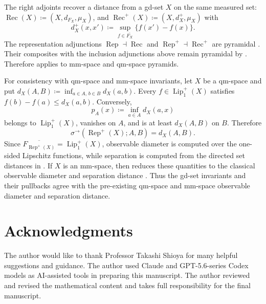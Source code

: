 \documentclass{amsart}
\theoremstyle{plain}
\theoremstyle{definition}
\theoremstyle{remark}
\newcommand{\lipplus}{\operatorname{Lip}^{+}_{1}}
\begin{document}
The right adjoints recover a distance from a gd-set $X$ on the same measured
set: $\operatorname{Rec}(X)\coloneqq(X,d_{F_X},\mu_X)$, and
$\operatorname{Rec}^{+}(X)\coloneqq(X,d_X^{+},\mu_X)$ with
\[d_X^{+}(x,x')\coloneqq\sup_{f\in\overline{F_X}}\{f(x')-f(x)\}.\]
The representation adjunctions $\operatorname{Rep}\dashv\operatorname{Rec}$ and
$\operatorname{Rep}^{+}\dashv\operatorname{Rec}^{+}$ are pyramidal
\cite[Corollary~A.12]{gds3-ja}.  Their composites with the inclusion
adjunctions above remain pyramidal by
\cite[Proposition~A.8]{gds3-ja}.  Therefore
 applies to mm-space and qm-space
pyramids.

For consistency with qm-space and mm-space invariants, let $X$ be a qm-space
and put $d_X(A,B)\coloneqq\inf_{a\in A,\,b\in B}d_X(a,b)$.  Every
$f\in\lipplus(X)$ satisfies $f(b)-f(a)\leq d_X(a,b)$.  Conversely,
\[
p_A(x)\coloneqq\inf_{a\in A}d_X(a,x)
\]
belongs to $\lipplus(X)$, vanishes on $A$, and is at least $d_X(A,B)$ on
$B$.  Therefore
\begin{equation}
\label{eq:qms-directed-separation-computation}
\sigma^{\to}(\operatorname{Rep}^{+}(X);A,B)=d_X(A,B).
\end{equation}
Since $\overline{F_{\operatorname{Rep}^{+}(X)}}=\lipplus(X)$, observable diameter is
computed over the one-sided Lipschitz functions, while separation is computed
from the directed set distances in
.  If $X$ is an mm-space, then
 reduces these quantities to the
	classical observable diameter and separation distance
	\cite[Definitions~2.13 and~2.24]{shioya2016mmg}.  Thus the
gd-set invariants and their pullbacks agree with the pre-existing qm-space and
mm-space observable diameter and separation distance.

\section*{Acknowledgments}

The author would like to thank Professor Takashi Shioya for many helpful
suggestions and guidance.  The author used Claude and GPT-5.6-series Codex
models as AI-assisted tools in preparing this manuscript.  The author
reviewed and revised the mathematical content and takes full responsibility
for the final manuscript.
\end{document}
